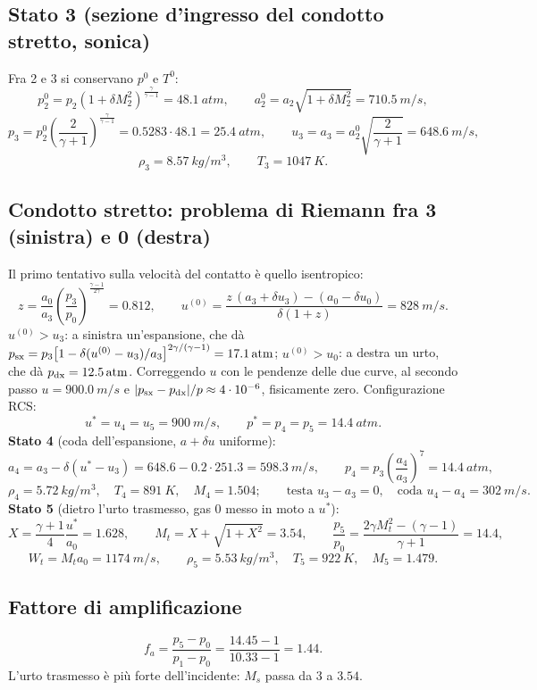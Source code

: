 \documentclass[11pt,a4paper]{article}
\newcommand{\fa}{f_a}
\begin{document}
\subsection{Stato 3 (sezione d'ingresso del condotto stretto, sonica)}
Fra 2 e 3 si conservano $p^0$ e $T^0$:
\[
  p^0_2=p_2\left(1+\delta M_2^2\right)^{\frac{\gamma}{\gamma-1}}=\SI{48.1}{atm},\qquad
  a^0_2=a_2\sqrt{1+\delta M_2^2}=\SI{710.5}{m/s},
\]
\[
  p_3=p^0_2\left(\frac{2}{\gamma+1}\right)^{\frac{\gamma}{\gamma-1}}=\num{0.5283}\cdot\num{48.1}=\SI{25.4}{atm},\qquad
  u_3=a_3=a^0_2\sqrt{\frac{2}{\gamma+1}}=\SI{648.6}{m/s},
\]
\[
  \rho_3=\SI{8.57}{kg/m^3},\qquad T_3=\SI{1047}{K}.
\]

\subsection{Condotto stretto: problema di Riemann fra 3 (sinistra) e 0 (destra)}
Il primo tentativo sulla velocità del contatto è quello isentropico:
\[
  z=\frac{a_0}{a_3}\left(\frac{p_3}{p_0}\right)^{\frac{\gamma-1}{2\gamma}}=\num{0.812},\qquad
  u^{(0)}=\frac{z\,(a_3+\delta u_3)-(a_0-\delta u_0)}{\delta(1+z)}=\SI{828}{m/s}.
\]
$u^{(0)}>u_3$: a sinistra un'espansione, che dà $p_{\rm sx}=p_3\bigl[1-\delta(u^{(0)}-u_3)/a_3\bigr]^{2\gamma/(\gamma-1)}=\SI{17.1}{atm}$;
$u^{(0)}>u_0$: a destra un urto, che dà $p_{\rm dx}=\SI{12.5}{atm}$. Correggendo $u$ con le pendenze delle due
curve, al secondo passo $u=\SI{900.0}{m/s}$ e $|p_{\rm sx}-p_{\rm dx}|/p\approx4\cdot10^{-6}$,
fisicamente zero. Configurazione RCS:
\[
  u^*=u_4=u_5=\SI{900}{m/s},\qquad p^*=p_4=p_5=\SI{14.4}{atm}.
\]
\textbf{Stato 4} (coda dell'espansione, $a+\delta u$ uniforme):
\[
  a_4=a_3-\delta(u^*-u_3)=\num{648.6}-\num{0.2}\cdot\num{251.3}=\SI{598.3}{m/s},\qquad
  p_4=p_3\left(\frac{a_4}{a_3}\right)^{7}=\SI{14.4}{atm},
\]
\[
  \rho_4=\SI{5.72}{kg/m^3},\quad T_4=\SI{891}{K},\quad M_4=\num{1.504};\qquad
  \text{testa } u_3-a_3=0,\quad \text{coda } u_4-a_4=\SI{302}{m/s}.
\]
\textbf{Stato 5} (dietro l'urto trasmesso, gas 0 messo in moto a $u^*$):
\[
  X=\frac{\gamma+1}{4}\frac{u^*}{a_0}=\num{1.628},\qquad M_t=X+\sqrt{1+X^2}=\num{3.54},\qquad
  \frac{p_5}{p_0}=\frac{2\gamma M_t^2-(\gamma-1)}{\gamma+1}=\num{14.4},
\]
\[
  W_t=M_ta_0=\SI{1174}{m/s},\qquad \rho_5=\SI{5.53}{kg/m^3},\quad T_5=\SI{922}{K},\quad M_5=\num{1.479}.
\]

\subsection{Fattore di amplificazione}
\[
  \fa=\frac{p_5-p_0}{p_1-p_0}=\frac{\num{14.45}-1}{\num{10.33}-1}=\num{1.44}.
\]
L'urto trasmesso è più forte dell'incidente: $M_s$ passa da 3 a $\num{3.54}$.
\end{document}
